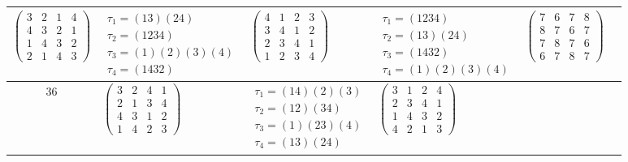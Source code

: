 \begin{longtable}{|c|p{2.7cm}|p{2.7cm}|p{2.7cm}|p{2.7cm}|p{2.7cm}|}
    $\begin{pmatrix} 3 & 2 & 1 & 4 \\ 4 & 3 & 2 & 1 \\ 1 & 4 & 3 & 2 \\ 2 & 1 & 4 & 3 \end{pmatrix}$               &
    $\begin{array}{l}\tau_{1}=(13)(24)\\ \tau_{2}=(1234)\\ \tau_{3}=(1)(2)(3)(4)\\ \tau_{4}=(1432)\end{array}$     &
    $\begin{pmatrix} 4 & 1 & 2 & 3 \\ 3 & 4 & 1 & 2 \\ 2 & 3 & 4 & 1 \\ 1 & 2 & 3 & 4 \end{pmatrix}$               &
    $\begin{array}{l}\tau_{1}=(1234)\\ \tau_{2}=(13)(24)\\ \tau_{3}=(1432)\\ \tau_{4}=(1)(2)(3)(4)\end{array}$     &
    $\begin{pmatrix} 7 & 6 & 7 & 8 \\ 8 & 7 & 6 & 7 \\ 7 & 8 & 7 & 6 \\ 6 & 7 & 8 & 7 \end{pmatrix}$                                                                                           \\
    \hline
    36                                                                                                             &
    $\begin{pmatrix} 3 & 2 & 4 & 1 \\ 2 & 1 & 3 & 4 \\ 4 & 3 & 1 & 2 \\ 1 & 4 & 2 & 3 \end{pmatrix}$               &
    $\begin{array}{l}\tau_{1}=(14)(2)(3)\\ \tau_{2}=(12)(34)\\ \tau_{3}=(1)(23)(4)\\ \tau_{4}=(13)(24)\end{array}$ &
    $\begin{pmatrix} 3 & 1 & 2 & 4 \\ 2 & 3 & 4 & 1 \\ 1 & 4 & 3 & 2 \\ 4 & 2 & 1 & 3 \end{pmatrix}$               &

\end{longtable}
